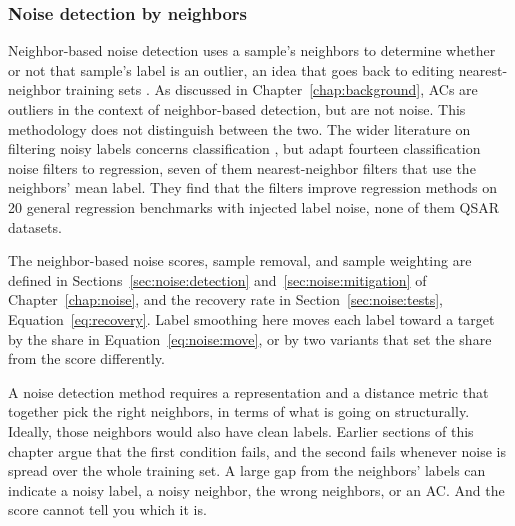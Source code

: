 \subsubsection{Noise detection by neighbors}\label{sec:flaws:neighbors}

Neighbor-based noise detection uses a sample's neighbors to determine whether or not that sample's label is an outlier, an idea that goes back to editing nearest-neighbor training sets \citep{Wilson1972}. As discussed in Chapter~\ref{chap:background}, ACs are outliers in the context of neighbor-based detection, but are not noise. This methodology does not distinguish between the two. The wider literature on filtering noisy labels concerns classification \citep{Brodley1999, frenay2014classification}, but \citet{Martin2021} adapt fourteen classification noise filters to regression, seven of them nearest-neighbor filters that use the neighbors' mean label. They find that the filters improve regression methods on 20 general regression benchmarks with injected label noise, none of them QSAR datasets. 

The neighbor-based noise scores, sample removal, and sample weighting are defined in Sections~\ref{sec:noise:detection} and~\ref{sec:noise:mitigation} of Chapter~\ref{chap:noise}, and the recovery rate in Section~\ref{sec:noise:tests}, Equation~\ref{eq:recovery}. Label smoothing here moves each label toward a target by the share in Equation~\ref{eq:noise:move}, or by two variants that set the share from the score differently.

A noise detection method requires a representation and a distance metric that together pick the right neighbors, in terms of what is going on structurally. Ideally, those neighbors would also have clean labels. Earlier sections of this chapter argue that the first condition fails, and the second fails whenever noise is spread over the whole training set. A large gap from the neighbors' labels can indicate a noisy label, a noisy neighbor, the wrong neighbors, or an AC. And the score cannot tell you which it is. 

